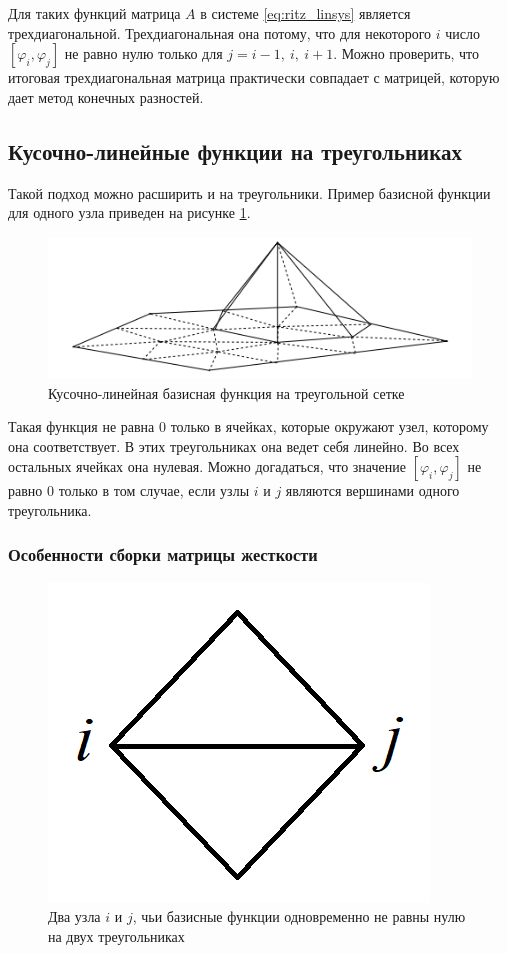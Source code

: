 \documentclass[a4paper, 11pt]{article}
\begin{document}
Для таких функций матрица $A$ в системе \eqref{eq:ritz_linsys} является трехдиагональной. Трехдиагональная она потому, что для некоторого $i$ число $[\varphi_i, \varphi_j]$ не равно нулю только для $j = i-1,~i,~i+1$. Можно проверить, что итоговая трехдиагональная матрица практически совпадает с матрицей, которую дает метод конечных разностей.

\subsection{Кусочно-линейные функции на треугольниках}
Такой подход можно расширить и на треугольники. Пример базисной функции для одного узла приведен на рисунке \ref{pic:p1}.
\begin{figure}[h] \centering
	\includegraphics[scale=0.4]{p1}
	\caption{Кусочно-линейная базисная функция на треугольной сетке\label{pic:p1}}
\end{figure}
Такая функция не равна 0 только в ячейках, которые окружают узел, которому она соответствует. В этих треугольниках она ведет себя линейно. Во всех остальных ячейках она нулевая. Можно догадаться, что значение $[\varphi_i, \varphi_j]$ не равно 0 только в том случае, если узлы $i$ и $j$ являются вершинами одного треугольника.  

\subsubsection{Особенности сборки матрицы жесткости}

\begin{figure}[h] \centering
	\includegraphics[scale=0.4]{two_cells}
	\caption{Два узла $i$ и $j$, чьи базисные функции одновременно не равны нулю на двух треугольниках\label{pic:two_cells}}
\end{figure}
\end{document}
